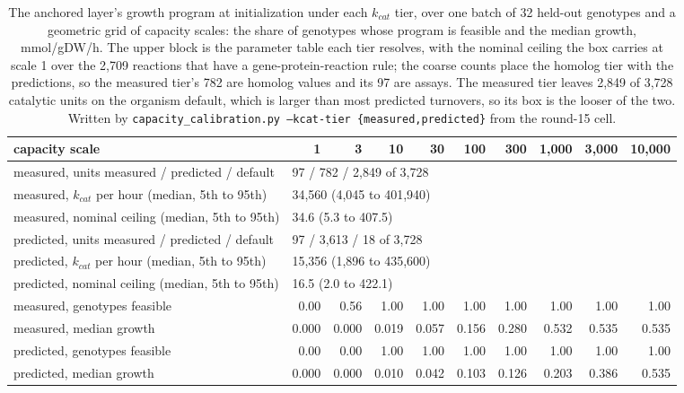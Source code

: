 \begin{table}[H]
  \centering
  \footnotesize
  \caption[The capacity box under the two $k_{cat}$ tiers]{The anchored layer's growth program at initialization under each $k_{cat}$ tier, over one batch of 32 held-out genotypes and a geometric grid of capacity scales: the share of genotypes whose program is feasible and the median growth, mmol/gDW/h. The upper block is the parameter table each tier resolves, with the nominal ceiling the box carries at scale 1 over the 2,709 reactions that have a gene-protein-reaction rule; the coarse counts place the homolog tier with the predictions, so the measured tier's 782 are homolog values and its 97 are assays. The measured tier leaves 2,849 of 3,728 catalytic units on the organism default, which is larger than most predicted turnovers, so its box is the looser of the two. Written by \texttt{capacity\_calibration.py --kcat-tier \{measured,predicted\}} from the round-15 cell.}
  \label{tab:kcat-tier-capacity}
  \begin{tabular}{@{}lrrrrrrrrr@{}}
    \hline
    capacity scale & 1 & 3 & 10 & 30 & 100 & 300 & 1,000 & 3,000 & 10,000 \\
    \hline
    measured, units measured / predicted / default & \multicolumn{9}{l}{97 / 782 / 2,849 of 3,728} \\
    measured, $k_{cat}$ per hour (median, 5th to 95th) & \multicolumn{9}{l}{34,560 (4,045 to 401,940)} \\
    measured, nominal ceiling (median, 5th to 95th) & \multicolumn{9}{l}{34.6 (5.3 to 407.5)} \\
    predicted, units measured / predicted / default & \multicolumn{9}{l}{97 / 3,613 / 18 of 3,728} \\
    predicted, $k_{cat}$ per hour (median, 5th to 95th) & \multicolumn{9}{l}{15,356 (1,896 to 435,600)} \\
    predicted, nominal ceiling (median, 5th to 95th) & \multicolumn{9}{l}{16.5 (2.0 to 422.1)} \\
    \hline
    measured, genotypes feasible & 0.00 & 0.56 & 1.00 & 1.00 & 1.00 & 1.00 & 1.00 & 1.00 & 1.00 \\
    measured, median growth & 0.000 & 0.000 & 0.019 & 0.057 & 0.156 & 0.280 & 0.532 & 0.535 & 0.535 \\
    predicted, genotypes feasible & 0.00 & 0.00 & 1.00 & 1.00 & 1.00 & 1.00 & 1.00 & 1.00 & 1.00 \\
    predicted, median growth & 0.000 & 0.000 & 0.010 & 0.042 & 0.103 & 0.126 & 0.203 & 0.386 & 0.535 \\
    \hline
  \end{tabular}
\end{table}
